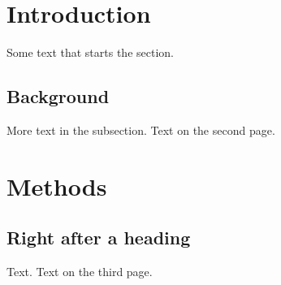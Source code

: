 \documentclass[twoside]{article}
\begin{document}
\section{Introduction}
Some text that starts the section.
\subsection{Background}
More text in the subsection.
\newpage
Text on the second page.
\section{Methods}
\subsection{Right after a heading}
Text.
\newpage
Text on the third page.
\end{document}
